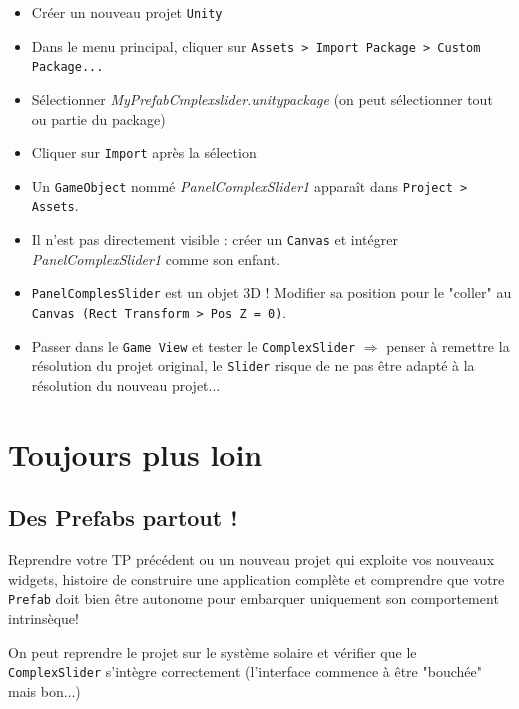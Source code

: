 \documentclass[a4paper,10pt]{article}
\newenvironment{solution}%
{\begin{tcolorbox}[breakable,colback=red!5!white,colframe=red!75!black,title=Solution]}%
{\end{tcolorbox}}
\begin{document}
\ifversionenseignant
\begin{solution}
	\begin{itemize}
		\item Créer un nouveau projet \texttt{Unity}
		\item Dans le menu principal, cliquer sur \texttt{Assets > Import Package > Custom Package...}
		\item Sélectionner \textit{MyPrefabCmplexslider.unitypackage} (on peut sélectionner tout ou partie du package)
		\item Cliquer sur \texttt{Import} après la sélection
		\item Un \texttt{GameObject} nommé \textit{PanelComplexSlider1} apparaît dans \texttt{Project > Assets}.		
		\item Il n'est pas directement visible : créer un \texttt{Canvas} et intégrer \textit{PanelComplexSlider1} comme son enfant.		
		\item \texttt{PanelComplesSlider} est un objet 3D ! Modifier sa position pour le "coller" au \texttt{Canvas (Rect Transform > Pos Z = 0)}.		
		\item Passer dans le \texttt{Game View} et tester le \texttt{ComplexSlider} $\Rightarrow$ penser à remettre la résolution du projet original, le \texttt{Slider} risque de ne pas être adapté à la résolution du nouveau projet...		
	\end{itemize}

\end{solution}
\fi 


\section{Toujours plus loin}

\subsection{Des Prefabs partout !}
Reprendre votre TP précédent ou un nouveau projet qui exploite vos nouveaux widgets, histoire de construire une application complète et comprendre que votre \texttt{Prefab} doit bien être autonome pour embarquer uniquement son comportement intrinsèque!

\ifversionenseignant
\begin{solution}
On peut reprendre le projet sur le système solaire et vérifier que le \texttt{ComplexSlider} s'intègre correctement (l'interface commence à être "bouchée" mais bon...)	
\end{solution}
\fi 
\end{document}
